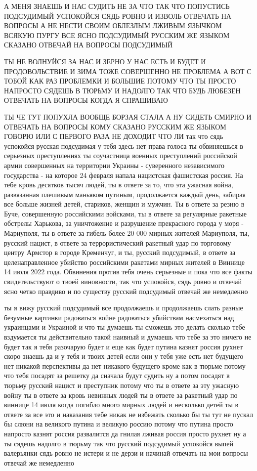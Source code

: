 А МЕНЯ ЗНАЕШЬ И НАС СУДИТЬ НЕ ЗА ЧТО ТАК ЧТО ПОПУСТИСЬ ПОДСУДИМЫЙ УСПОКОЙСЯ
СЯДЬ РОВНО И ИЗВОЛЬ ОТВЕЧАТЬ НА ВОПРОСЫ А НЕ НЕСТИ СВОИМ ОБЛЕЗЛЫМ ЛЖИВЫМ
ЯЗЫЧКОМ ВСЯКУЮ ПУРГУ ВСЕ ЯСНО ПОДСУДИМЫЙ РУССКИМ ЖЕ ЯЗЫКОМ СКАЗАНО ОТВЕЧАЙ НА
ВОПРОСЫ ПОДСУДИМЫЙ

ТЫ НЕ ВОЛНУЙСЯ ЗА НАС И ЗЕРНО У НАС ЕСТЬ И БУДЕТ И ПРОДОВОЛЬСТВИЕ И ЗИМА ТОЖЕ
СОВЕРШЕННО НЕ ПРОБЛЕМА А ВОТ С ТОБОЙ КАК РАЗ ПРОБЛЕМКИ И БОЛЬШИЕ ПОТОМУ ЧТО ТЫ
ПРОСТО НАПРОСТО СЯДЕШЬ В ТЮРЬМУ И НАДОЛГО ТАК ЧТО БУДЬ ЛЮБЕЗЕН ОТВЕЧАТЬ НА
ВОПРОСЫ КОГДА Я СПРАШИВАЮ

ТЫ ЧЕ ТУТ ПОПУХЛА ВООБЩЕ БОРЗАЯ СТАЛА А НУ СИДЕТЬ СМИРНО И ОТВЕЧАТЬ НА ВОПРОСЫ
КОМУ СКАЗАНО РУССКИМ ЖЕ ЯЗЫКОМ ГОВОРЮ ИЛИ С ПЕРВОГО РАЗА НЕ ДОХОДИТ ЧТО ЛИ так
что сядь успокойся русская подсудимая у тебя здесь нет права голоса ты
обвиняешься в серьезных преступлениях ты соучастница военных преступлений
российской армии совершенных на территории Украины - суверенного независимого
государства - на которое 24 февраля напала нацистская фашистская россия. На
тебе кровь десятков тысяч людей, ты в ответе за то, что эта ужасная война,
развязанная плешивым маньяком путиным, продолжается каждый день, забирая все
больше жизней детей, стариков, женщин и мужчин.  Ты в ответе за резню в Буче,
совершенную российскими войсками, ты в ответе за регулярные ракетные обстрелы
Харькова, за уничтожение и разрушение прекрасного города у моря - Мариуполя, ты
в ответе за гибель более 20 000 мирных жителей Мариуполя, ты, русский нацист, в
ответе за террористический ракетный удар по торговому центру Армстор в городе
Кременчуг, и ты, русский подсудимый, в ответе за целенаправленное убийство
российскими ракетами мирных жителей в Виннице 14 июля 2022 года. Обвинения
против тебя очень серьезные и пока что все факты свидетельствуют о твоей
виновности, так что успокойся, сядь ровно и отвечай ясно четко правдиво и по
существу русский подсудимый отвечай же немедленно

ты я вижу русский подсудимый все продолжаешь и продолжаешь слать разные
безумные картинки радоваться войне радоваться убийствам насмехаться над
украинцами и Украиной и что ты думаешь ты сможешь это делать сколько тебе
вздумается ты действительно такой наивный и думаешь что тебе за это ничего не
будет так я тебя разочарую будет и еще как будет путина казнят россия рухнет
скоро знаешь да и у тебя и твоих детей если они у тебя уже есть нет будущего
нет никакой перспективы да нет никакого будущего кроме как в тюрьме потому что
тебя посадят за решетку да сначала будут судить ну а потом посадят в тюрьму
русский нацист и преступник потому что ты в ответе за эту ужасную войну ты в
ответе за кровь невинных людей ты в ответе за ракетный удар по виннице 14 июля
когда погибло много мирных людей и несколько детей ты в ответе за все это и
наказания тебе никак не избежать сколько бы ты тут не пускал бы слюни на
великого путина и великую россию потому что путина просто напросто казнят
россия развалится да гнилая лживая россия просто рухнет ну а ты сядешь надолго
в тюрьму так что русский подсудимый успокойся выпей валерьянки сядь ровно не
истери и не дерзи и начинай отвечать на мои вопросы отвечай же немедленно

